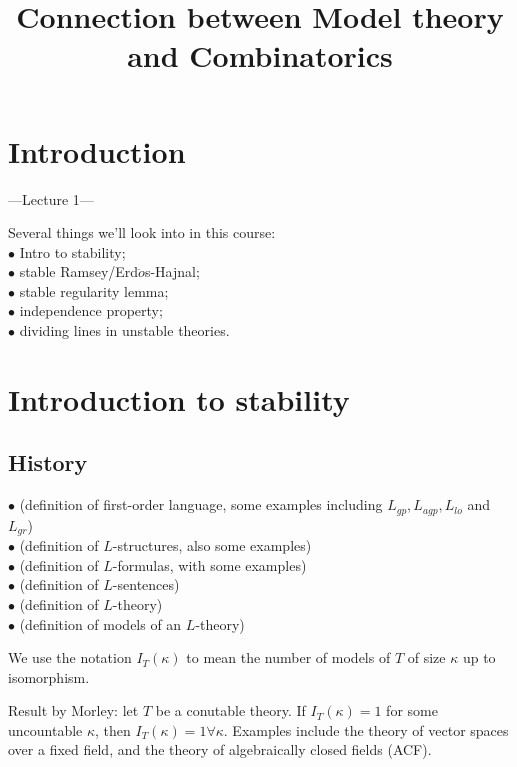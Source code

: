 \documentclass[a4paper]{article}
\begin{document}
\title{Connection between Model theory and Combinatorics}

\maketitle

\newpage

\tableofcontents

\newpage

\section{Introduction}
---Lecture 1---

Several things we'll look into in this course:\\
$\bullet$ Intro to stability;\\
$\bullet$ stable Ramsey/Erd$\ddot{o}$s-Hajnal;\\
$\bullet$ stable regularity lemma;\\
$\bullet$ independence property;\\
$\bullet$ dividing lines in unstable theories.

\newpage

\section{Introduction to stability}

\subsection{History}
$\bullet$ (definition of first-order language, some examples including $L_{gp},L_{agp},L_{lo}$ and $L_{gr}$)\\
$\bullet$ (definition of $L$-structures, also some examples)\\
$\bullet$ (definition of $L$-formulas, with some examples)\\
$\bullet$ (definition of $L$-sentences)\\
$\bullet$ (definition of $L$-theory)\\
$\bullet$ (definition of models of an $L$-theory)

We use the notation $I_T(\kappa)$ to mean the number of models of $T$ of size $\kappa$ up to isomorphism.

Result by Morley: let $T$ be a conutable theory. If $I_T(\kappa) = 1$ for some uncountable $\kappa$, then $I_T(\kappa) = 1 \forall \kappa$. Examples include the theory of vector spaces over a fixed field, and the theory of algebraically closed fields (ACF).
\end{document}
